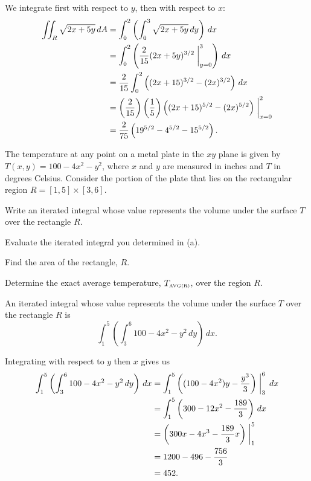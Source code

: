 \begin{exercises}
\begin{exerciseSolution}
	\item We integrate first with respect to $y$, then with respect to $x$:
\begin{align*}
\iint_R \sqrt{2x + 5y} \, dA &= \int_0^2 \left( \int_0^3 \sqrt{2x+5y} \, dy \right) \, dx \\
	&= \int_0^2 \left( \frac{2}{15}(2x+5y)^{3/2}\biggm|_{y=0}^3 \right) \, dx \\
	&= \frac{2}{15}\int_0^2 \left( (2x+15)^{3/2} - (2x)^{3/2} \right) \, dx \\
	&= \left(\frac{2}{15}\right)\left(\frac{1}{5}\right) \left( (2x+15)^{5/2} - (2x)^{5/2} \right)\biggm|_{x=0}^2  \\
	&= \frac{2}{75} \left(19^{5/2} - 4^{5/2} - 15^{5/2}\right).
\end{align*}
\ea
\end{exerciseSolution}

\item The temperature at any point on a metal plate in the $xy$ plane is given by $T(x,y) = 100-4x^2 - y^2$, where $x$ and $y$ are measured in inches and $T$ in degrees Celsius.  Consider the portion of the plate that lies on the rectangular region $R = [1,5] \times [3,6]$.

\ba
	\item Write an iterated integral whose value represents the volume under the surface $T$ over the rectangle $R$. 
	\item Evaluate the iterated integral you determined in (a).
	\item Find the area of the rectangle, $R$.
	\item Determine the exact average temperature, $T_{\mbox{\tiny{AVG}(R)}}$, over the region $R$.
\ea

\begin{exerciseSolution}
\ba
	\item An iterated integral whose value represents the volume under the surface $T$ over the rectangle $R$ is
\[\int_1^5 \left( \int_3^6 100 - 4x^2-y^2 \, dy \right) \, dx.\]

	\item Integrating with respect to $y$ then $x$ gives us
\begin{align*}
\int_1^5 \left( \int_3^6 100 - 4x^2-y^2 \, dy \right) \, dx &= \int_1^5 \left( (100-4x^2)y - \frac{y^3}{3} \right)\biggm|_3^6  \, dx \\
	&= \int_1^5 \left( 300-12x^2 - \frac{189}{3} \right) \, dx \\
	&= \left( 300x-4x^3 - \frac{189}{3}x \right)\biggm|_1^5  \\
	&= 1200 - 496 - \frac{756}{3} \\
	&= 452.
\end{align*}


\end{exerciseSolution}
\end{exercises}
